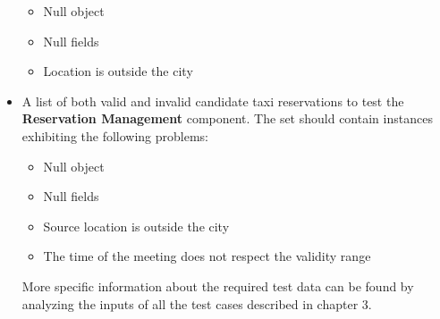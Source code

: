 \begin{itemize}
		\begin{itemize}
		\item Null object
		\item Null fields
		\item Location is outside the city
		\end{itemize}
	\item A list of both valid and invalid candidate taxi reservations to test the \textbf{Reservation Management} component. The set should contain instances exhibiting the following problems: 
		\begin{itemize}
		\item Null object
		\item Null fields
		\item Source location is outside the city
		\item The time of the meeting does not respect the validity range
		\end{itemize}	
		
More specific information about the required test data can be found by analyzing the inputs of all the test cases described in chapter 3.	
\end{itemize}